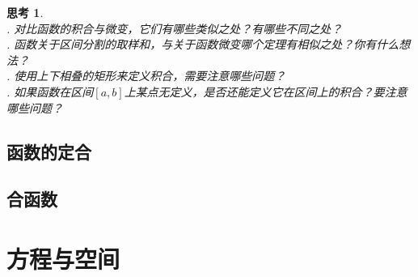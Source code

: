 \documentclass[12pt,UTF8]{ctexbook}
\newtheorem{sk}{思考}[section]
\begin{document}




\begin{sk}
    \mbox{} \\
    . 对比函数的积合与微变，它们有哪些类似之处？有哪些不同之处？\\
    . 函数关于区间分割的取样和，与关于函数微变哪个定理有相似之处？你有什么想法？\\
    . 使用上下相叠的矩形来定义积合，需要注意哪些问题？\\
    . 如果函数在区间$[a, b]$上某点无定义，是否还能定义它在区间上的积合？要注意哪些问题？
\end{sk}

\section{函数的定合}
\section{合函数}

\chapter{方程与空间}
\end{document}
